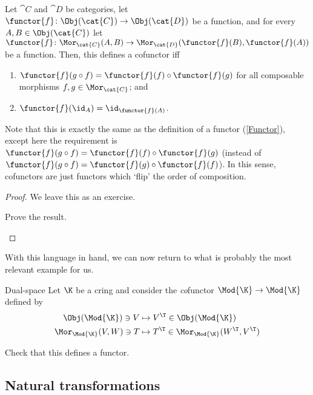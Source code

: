 \begin{prp}{}{}
	Let $\cat{C}$ and $\cat{D}$ be categories, let $\functor{f}\colon \Obj (\cat{C})\rightarrow \Obj (\cat{D})$ be a function, and for every $A,B\in \Obj (\cat{C})$ let $\functor{f}\colon \Mor _{\cat{C}}(A,B)\rightarrow \Mor _{\cat{D}}(\functor{f}(B),\functor{f}(A))$ be a function.  Then, this defines a cofunctor iff
	\begin{enumerate}
		\item $\functor{f}(g\circ f)=\functor{f}(f)\circ \functor{f}(g)$ for all composable morphisms $f,g\in \Mor _{\cat{C}}$; and
		\item $\functor{f}(\id _A)=\id _{\functor{f}(A)}$.
	\end{enumerate}
	\begin{rmk}
		Note that this is exactly the same as the definition of a functor (\cref{Functor}), except here the requirement is $\functor{f}(g\circ f)=\functor{f}(f)\circ \functor{f}(g)$ (instead of $\functor{f}(g\circ f)=\functor{f}(g)\circ \functor{f}(f)$).  In this sense, cofunctors are just functors which `flip' the order of composition.
	\end{rmk}
	\begin{proof}
		We leave this as an exercise.
		\begin{exr}[breakable=false]{}{}
			Prove the result.
		\end{exr}
	\end{proof}
\end{prp}
With this language in hand, we can now return to what is probably the most relevant example for us.
\begin{exm}{Dual-space}{}
	Let $\K$ be a cring and consider the \emph{co}functor $\Mod{\K}\rightarrow \Mod{\K}$ defined by
	\begin{subequations}
		\begin{align}
			\Obj (\Mod{\K})\ni V & \mapsto V^{\T}\in \Obj (\Mod{\K}) \\
			\Mor _{\Mod{\K}}(V,W)\ni T & \mapsto T^{\T}\in \Mor _{\Mod{\K}}(W^{\T},V^{\T})
		\end{align}
	\end{subequations}
	\begin{exr}[breakable=false]{}{}
		Check that this defines a functor.
	\end{exr}
\end{exm}

\subsection{Natural transformations}\label{sbsB.2.2}

